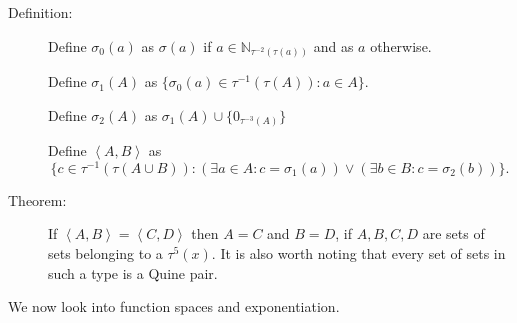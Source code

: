 \documentclass[12pt]{article}
\begin{document}
\begin{description}

\item[Definition:]  Define $\sigma_0(a)$ as $\sigma(a)$ if $a \in {\mathbb N}_{\tau^{-2}(\tau(a))}$ and as $a$ otherwise.

Define $\sigma_1(A)$ as $\{\sigma_0(a) \in \tau^{-1}(\tau(A)):a \in A\}$.

Define $\sigma_2(A)$ as $\sigma_1(A) \cup \{0_{\tau^{-3}(A)}\}$

Define $\left<A,B\right>$ as $$\{c \in \tau^{-1}(\tau(A \cup B)): (\exists a \in A:c=\sigma_1(a)) \vee (\exists b \in B:c = \sigma_2(b))\}.$$

\item[Theorem:]  If $\left<A,B\right>=\left<C,D\right>$ then $A=C$ and $B=D$, if $A,B,C,D$ are sets of sets belonging to a $\tau^5(x)$.  It is also worth noting that every set of sets in such a type is a Quine pair.

\end{description}

We now look into function spaces and exponentiation.
\end{document}
